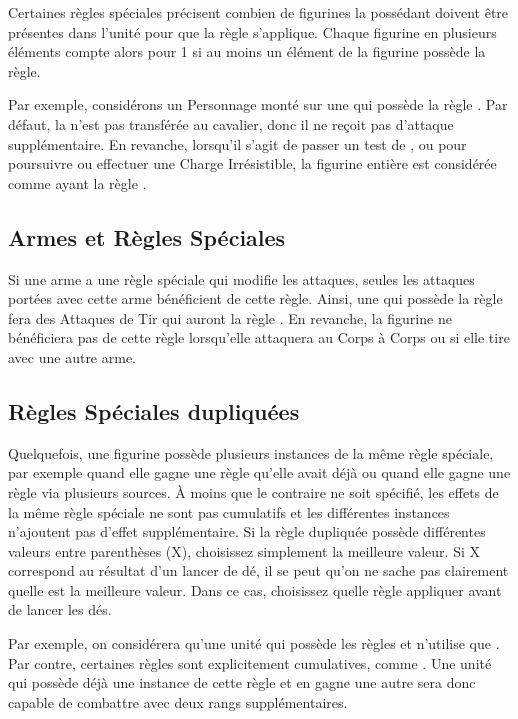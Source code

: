Certaines règles spéciales précisent combien de figurines la possédant doivent être présentes dans l'unité pour que la règle s'applique. Chaque figurine en plusieurs éléments compte alors pour 1 si au moins un élément de la figurine possède la règle.

Par exemple, considérons un Personnage monté sur une \monstrousbeast{} qui possède la règle \frenzy{}. Par défaut, la \frenzy{} n'est pas transférée au cavalier, donc il ne reçoit pas d'attaque supplémentaire. En revanche, lorsqu'il s'agit de passer un test de \frenzy{}, ou pour poursuivre ou effectuer une Charge Irrésistible, la figurine entière est considérée comme ayant la règle \frenzy{}.

\subsection{Armes et Règles Spéciales}

Si une arme a une règle spéciale qui modifie les attaques, seules les attaques portées avec cette arme bénéficient de cette règle. Ainsi, une \handgun{} qui possède la règle \armourpiercing{} fera des Attaques de Tir qui auront la règle \armourpiercing{}. En revanche, la figurine ne bénéficiera pas de cette règle lorsqu'elle attaquera au Corps à Corps ou si elle tire avec une autre arme.

\subsection{Règles Spéciales dupliquées}

Quelquefois, une figurine possède plusieurs instances de la même règle spéciale, par exemple quand elle gagne une règle qu'elle avait déjà ou quand elle gagne une règle via plusieurs sources. À moins que le contraire ne soit spécifié, les effets de la même règle spéciale ne sont pas cumulatifs et les différentes instances n'ajoutent pas d'effet supplémentaire. Si la règle dupliquée possède différentes valeurs entre parenthèses (X), choisissez simplement la meilleure valeur. Si X correspond au résultat d'un lancer de dé, il se peut qu'on ne sache pas clairement quelle est la meilleure valeur. Dans ce cas, choisissez quelle règle appliquer avant de lancer les dés.

Par exemple, on considérera qu'une unité qui possède les règles  et  n'utilise que . Par contre, certaines règles sont explicitement cumulatives, comme \fightinextrarank{}. Une unité qui possède déjà une instance de cette règle et en gagne une autre sera donc capable de combattre avec deux rangs supplémentaires. 

